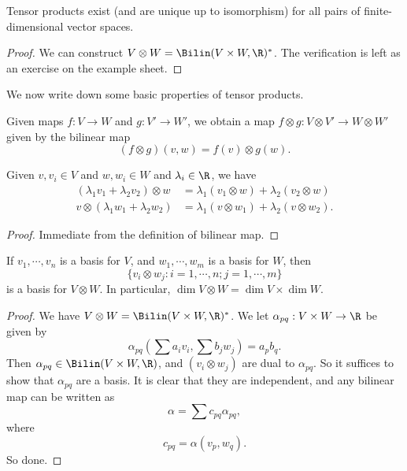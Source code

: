 \documentclass[a4paper]{article}
\begin{document}
\begin{lemma}
  Tensor products exist (and are unique up to isomorphism) for all pairs of finite-dimensional vector spaces.
\end{lemma}

\begin{proof}
  We can construct $V \otimes W = \Bilin(V \times W, \R)^*$. The verification is left as an exercise on the example sheet.
\end{proof}

We now write down some basic properties of tensor products.
\begin{prop}
  Given maps $f: V \to W$ and $g: V' \to W'$, we obtain a map $f \otimes g: V \otimes V' \to W \otimes W'$ given by the bilinear map
  \[
    (f \otimes g)(v, w) = f(v) \otimes g(w).
  \]
\end{prop}

\begin{lemma}
  Given $v, v_i \in V$ and $w, w_i \in W$ and $\lambda_i \in \R$, we have
  \begin{align*}
    (\lambda_1 v_1 + \lambda_2 v_2) \otimes w &= \lambda_1 (v_1 \otimes w) + \lambda_2 (v_2 \otimes w)\\
    v \otimes (\lambda_1 w_1 + \lambda_2 w_2) &= \lambda_1 (v \otimes w_1) + \lambda_2 (v \otimes w_2).
  \end{align*}
\end{lemma}

\begin{proof}
  Immediate from the definition of bilinear map.
\end{proof}

\begin{lemma}
  If $v_1,\cdots, v_n$ is a basis for $V$, and $w_1, \cdots, w_m$ is a basis for $W$, then
  \[
    \{v_i \otimes w_j: i = 1, \cdots, n; j = 1, \cdots, m\}
  \]
  is a basis for $V \otimes W$. In particular, $\dim V \otimes W = \dim V \times \dim W$.
\end{lemma}

\begin{proof}
  We have $V \otimes W = \Bilin(V \times W, \R)^*$. We let $\alpha_{pq}:V \times W \to \R$ be given by
  \[
    \alpha_{pq}\left(\sum a_i v_i, \sum b_j w_j\right) = a_p b_q.
  \]
  Then $\alpha_{pq} \in \Bilin(V\times W, \R)$, and $(v_i \otimes w_j)$ are dual to $\alpha_{pq}$. So it suffices to show that $\alpha_{pq}$ are a basis. It is clear that they are independent, and any bilinear map can be written as
  \[
    \alpha = \sum c_{pq}\alpha_{pq},
  \]
  where
  \[
    c_{pq} = \alpha(v_p, w_q).
  \]
  So done.
\end{proof}
\end{document}

